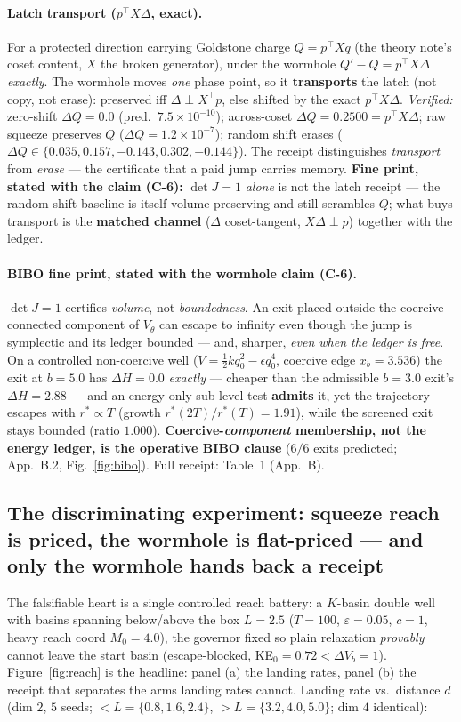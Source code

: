 \documentclass[11pt]{article}
\newcommand{\half}{\tfrac12}
\newcommand{\detJ}{\det J}
\begin{document}
\paragraph{Latch transport ($p^\top X\Delta$, exact).} For a protected direction carrying Goldstone charge $Q=p^\top X q$ (the theory note's coset content, $X$ the broken generator), under the wormhole $Q'-Q=p^\top X\Delta$ \emph{exactly}. The wormhole moves \emph{one} phase point, so it \textbf{transports} the latch (not copy, not erase): preserved iff $\Delta\perp X^\top p$, else shifted by the exact $p^\top X\Delta$. \emph{Verified:} zero-shift $\Delta Q=0.0$ (pred.\ $7.5{\times}10^{-10}$); across-coset $\Delta Q=0.2500=p^\top X\Delta$; raw squeeze preserves $Q$ ($\Delta Q=1.2{\times}10^{-7}$); random shift erases ($\Delta Q\in\{0.035,0.157,-0.143,0.302,-0.144\}$). The receipt distinguishes \emph{transport} from \emph{erase} --- the certificate that a paid jump carries memory. \textbf{Fine print, stated with the claim (C-6):} $\detJ=1$ \emph{alone} is not the latch receipt --- the random-shift baseline is itself volume-preserving and still scrambles $Q$; what buys transport is the \textbf{matched channel} ($\Delta$ coset-tangent, $X\Delta\perp p$) together with the ledger.

\paragraph{BIBO fine print, stated with the wormhole claim (C-6).} $\detJ=1$ certifies \emph{volume}, not \emph{boundedness}. An exit placed outside the coercive connected component of $V_\theta$ can escape to infinity even though the jump is symplectic and its ledger bounded --- and, sharper, \emph{even when the ledger is free}. On a controlled non-coercive well ($V=\half kq_0^2-\epsilon q_0^4$, coercive edge $x_b=3.536$) the exit at $b=5.0$ has $\Delta H=0.0$ \emph{exactly} --- cheaper than the admissible $b=3.0$ exit's $\Delta H=2.88$ --- and an energy-only sub-level test \textbf{admits} it, yet the trajectory escapes with $r^\ast\propto T$ (growth $r^\ast(2T)/r^\ast(T)=1.91$), while the screened exit stays bounded (ratio $1.000$). \textbf{Coercive-\emph{component} membership, not the energy ledger, is the operative BIBO clause} ($6/6$ exits predicted; App.~B.2, Fig.~\ref{fig:bibo}). Full receipt: Table~1 (App.~B).

\subsection{The discriminating experiment: squeeze reach is priced, the wormhole is flat-priced --- and only the wormhole hands back a receipt}
The falsifiable heart is a single controlled reach battery: a $K$-basin double well with basins spanning below/above the box $L=2.5$ ($T=100$, $\varepsilon=0.05$, $c=1$, heavy reach coord $M_0=4.0$), the governor fixed so plain relaxation \emph{provably} cannot leave the start basin (escape-blocked, KE$_0=0.72<\Delta V_b=1$). Figure~\ref{fig:reach} is the headline: panel (a) the landing rates, panel (b) the receipt that separates the arms landing rates cannot. Landing rate vs.\ distance $d$ (dim $2$, $5$ seeds; $<L=\{0.8,1.6,2.4\}$, $>L=\{3.2,4.0,5.0\}$; dim $4$ identical):
\end{document}
